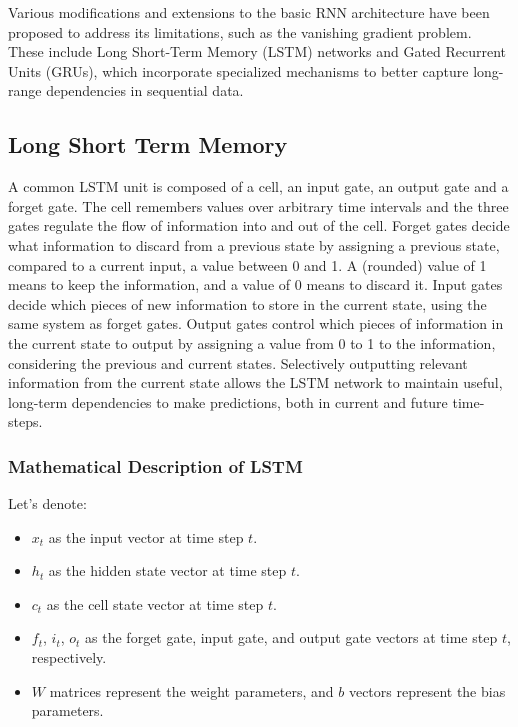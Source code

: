 \documentclass[a4paper]{report}
\begin{document}
{Various modifications and extensions to the basic RNN architecture have been proposed to address its limitations, such as the vanishing gradient problem. These include Long Short-Term Memory (LSTM) networks and Gated Recurrent Units (GRUs), which incorporate specialized mechanisms to better capture long-range dependencies in sequential data.

\subsection{Long Short Term Memory}
A common LSTM unit is composed of a cell, an input gate, an output gate and a forget gate. The cell remembers values over arbitrary time intervals and the three gates regulate the flow of information into and out of the cell. Forget gates decide what information to discard from a previous state by assigning a previous state, compared to a current input, a value between 0 and 1. A (rounded) value of 1 means to keep the information, and a value of 0 means to discard it. Input gates decide which pieces of new information to store in the current state, using the same system as forget gates. Output gates control which pieces of information in the current state to output by assigning a value from 0 to 1 to the information, considering the previous and current states. Selectively outputting relevant information from the current state allows the LSTM network to maintain useful, long-term dependencies to make predictions, both in current and future time-steps.

\subsubsection{Mathematical Description of LSTM}

Let's denote:

\begin{itemize}
    \item $x_t$ as the input vector at time step $t$.
    \item $h_t$ as the hidden state vector at time step $t$.
    \item $c_t$ as the cell state vector at time step $t$.
    \item $f_t$, $i_t$, $o_t$ as the forget gate, input gate, and output gate vectors at time step $t$, respectively.
    \item $W$ matrices represent the weight parameters, and $b$ vectors represent the bias parameters.
\end{itemize}

}
\end{document}
